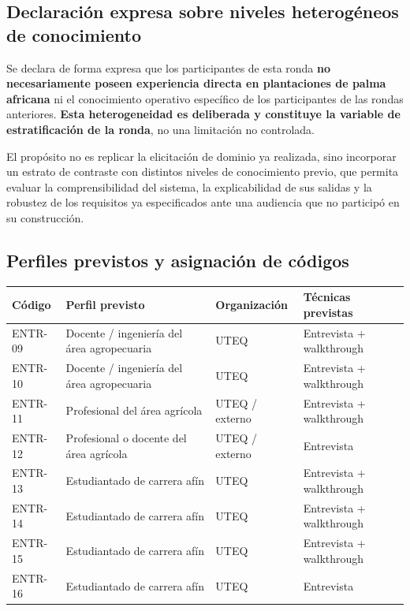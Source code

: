 \documentclass[11pt,a4paper]{article}
\begin{document}
\subsection{Declaración expresa sobre niveles heterogéneos de conocimiento}

\begin{tcolorbox}[colback=uteqverde!5,colframe=uteqverde,boxrule=0.8pt,arc=2pt,left=6pt,right=6pt,top=5pt,bottom=5pt]
Se declara de forma expresa que los participantes de esta ronda \textbf{no necesariamente poseen
experiencia directa en plantaciones de palma africana} ni el conocimiento operativo específico de los
participantes de las rondas anteriores. \textbf{Esta heterogeneidad es deliberada y constituye la variable
de estratificación de la ronda}, no una limitación no controlada.

El propósito no es replicar la elicitación de dominio ya realizada, sino incorporar un estrato de contraste
con distintos niveles de conocimiento previo, que permita evaluar la comprensibilidad del sistema, la
explicabilidad de sus salidas y la robustez de los requisitos ya especificados ante una audiencia que no
participó en su construcción.
\end{tcolorbox}

\subsection{Perfiles previstos y asignación de códigos}

\begin{longtable}{|C{2.1cm}|L{5.0cm}|L{4.2cm}|L{3.6cm}|}
\hline
{}\textbf{Código} & \textbf{Perfil previsto} & \textbf{Organización} & \textbf{Técnicas previstas} \\
\hline
ENTR-09 & Docente / ingeniería del área agropecuaria & UTEQ & Entrevista + walkthrough \\
\hline
ENTR-10 & Docente / ingeniería del área agropecuaria & UTEQ & Entrevista + walkthrough \\
\hline
ENTR-11 & Profesional del área agrícola & UTEQ / externo & Entrevista + walkthrough \\
\hline
ENTR-12 & Profesional o docente del área agrícola & UTEQ / externo & Entrevista \\
\hline
ENTR-13 & Estudiantado de carrera afín & UTEQ & Entrevista + walkthrough \\
\hline
ENTR-14 & Estudiantado de carrera afín & UTEQ & Entrevista + walkthrough \\
\hline
ENTR-15 & Estudiantado de carrera afín & UTEQ & Entrevista + walkthrough \\
\hline
ENTR-16 & Estudiantado de carrera afín & UTEQ & Entrevista \\
\hline
\end{longtable}
\end{document}
